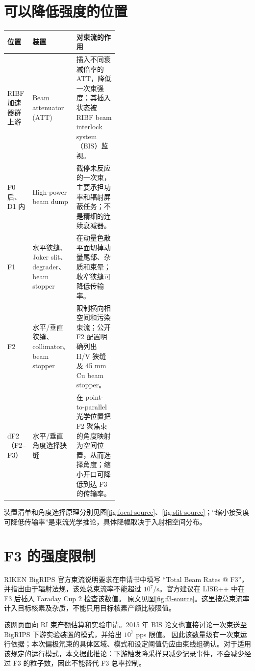 \documentclass[UTF8,11pt,a4paper]{ctexart}
\begin{document}
\section{可以降低强度的位置}

\noindent\begin{tabularx}{\linewidth}{@{}>{\raggedright\arraybackslash}p{0.18\linewidth}>{\raggedright\arraybackslash}p{0.27\linewidth}Y@{}}
\toprule
位置 & 装置 & 对束流的作用 \\
\midrule
RIBF 加速器群上游 & Beam attenuator (ATT) & 插入不同衰减倍率的 ATT，降低一次束强度；其插入状态被 RIBF beam interlock system（BIS）监视。\cite{bis}\\
F0 后、D1 内 & High-power beam dump & 截停未反应的一次束，主要承担功率和辐射屏蔽任务；不是精细的连续衰减器。\cite{bigrips-config}\\
F1 & 水平狭缝、Joker slit、degrader、beam stopper & 在动量色散平面切掉动量尾部、杂质和束晕；收窄狭缝可降低传输率。\cite{bigrips-config,bigrips-focal}\\
F2 & 水平/垂直狭缝、collimator、beam stopper & 限制横向相空间和污染束流；公开 F2 配置明确列出 H/V 狭缝及 45 mm Cu beam stopper。\cite{bigrips-focal}\\
dF2（F2--F3） & 水平/垂直角度选择狭缝 & 在 point-to-parallel 光学位置把 F2 聚焦束的角度映射为空间位置，从而选择角度；缩小开口可降低到达 F3 的传输率。\cite{f2-f3-slit}\\
\bottomrule
\end{tabularx}

装置清单和角度选择原理分别见图\ref{fig:focal-source}、\ref{fig:slit-source}；“缩小接受度可降低传输率”是束流光学推论，具体降幅取决于入射相空间分布。

\section{F3 的强度限制}

RIKEN BigRIPS 官方束流说明要求在申请书中填写 ``Total Beam Rates @ F3''，并指出由于辐射法规，该处总束流率不能超过 $10^7$/s。官方建议在 LISE++ 中在 F3 后插入 Faraday Cup 2 检查该数值。\cite{bigrips-intensity} 原文见图\ref{fig:f3-source}。这里按总束流率计入目标核素及杂质，不能只用目标核素产额比较限值。

该网页面向 RI 束产额估算和实验申请。2015 年 BIS 论文也直接讨论一次束送至 BigRIPS 下游实验装置的模式，并给出 $10^7$ pps 限值。\cite{bis2015} 因此该数量级有一次束运行依据；本次偏极氘束的具体区域、模式和设定阈值仍应由束线组确认。对于适用该规定的运行模式，本文据此推论：下游触发降采样只减少记录事件，不会减少经过 F3 的粒子数，因此不能替代 F3 总率控制。
\end{document}
